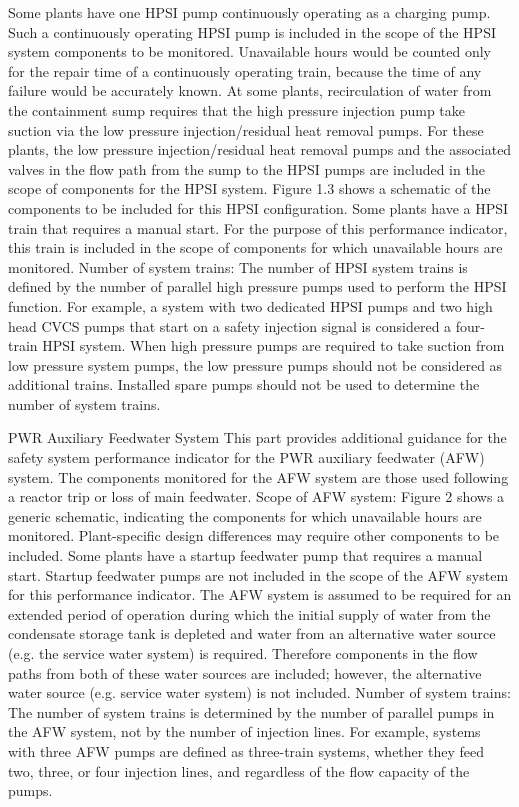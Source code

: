 Some plants have one HPSI pump continuously operating as a charging pump. Such a continuously operating HPSI pump is included in the scope of the HPSI system components to be monitored. Unavailable hours would be counted only for the repair time of a continuously operating train, because the time of any failure would be accurately known.
At some plants, recirculation of water from the containment sump requires that the high pressure injection pump take suction via the low pressure injection/residual heat removal pumps. For these plants, the low pressure injection/residual heat removal pumps and the associated valves in the flow path from the sump to the HPSI pumps are included in the scope of components for the HPSI system. Figure 1.3 shows a schematic of the components to be included for this HPSI configuration.
Some plants have a HPSI train that requires a manual start. For the purpose of this performance indicator, this train is included in the scope of components for which unavailable hours are monitored.
Number of system trains:  The number of HPSI system trains is defined by the number of parallel high pressure pumps used to perform the HPSI function. For example, a system with two dedicated HPSI pumps and two high head CVCS pumps that start on a safety injection signal is considered a four-train HPSI system. When high pressure pumps are required to take suction from low pressure system pumps, the low pressure pumps should not be considered as additional trains. Installed spare pumps should not be used to determine the number of system trains.







PWR Auxiliary Feedwater System
This part provides additional guidance for the safety system performance indicator for the PWR auxiliary feedwater (AFW) system. The components monitored for the AFW system are those used following a reactor trip or loss of main feedwater.
Scope of AFW system:  Figure 2 shows a generic schematic, indicating the components for which unavailable hours are monitored. Plant-specific design differences may require other components to be included.
Some plants have a startup feedwater pump that requires a manual start. Startup feedwater pumps are not included in the scope of the AFW system for this performance indicator.
The AFW system is assumed to be required for an extended period of operation during which the initial supply of water from the condensate storage tank is depleted and water from an alternative water source (e.g. the service water system) is required. Therefore components in the flow paths from both of these water sources are included; however, the alternative water source (e.g. service water system) is not included.
Number of system trains:  The number of system trains is determined by the number of parallel pumps in the AFW system, not by the number of injection lines. For example, systems with three AFW pumps are defined as three-train systems, whether they feed two, three, or four injection lines, and regardless of the flow capacity of the pumps.



